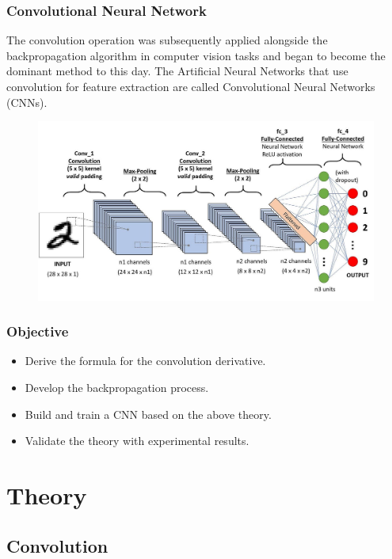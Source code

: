 \documentclass{beamer}
\begin{document}
    
    \begin{frame}
    	\frametitle{Convolutional Neural Network}
    	\justifying 
    	The convolution operation was subsequently applied alongside the backpropagation algorithm in computer vision tasks and began to become the dominant method to this day. The Artificial Neural Networks that use convolution for feature extraction are called Convolutional Neural Networks (CNNs). 
    	 
    	\begin{figure}
    		\centering
    		\includegraphics[width=0.7\linewidth]{src/conv_net}
    	\end{figure}
    \end{frame}
    
    
    \begin{frame}
    	\frametitle{Objective}
    	\begin{itemize}
    		\item Derive the formula for the convolution derivative.
    		\item Develop the backpropagation process.
    		\item Build and train a CNN based on the above theory.
    		\item Validate the theory with experimental results.
    	\end{itemize}
    \end{frame}
    
    
    \section{Theory}
    \subsection{Convolution}
    
\end{document}
